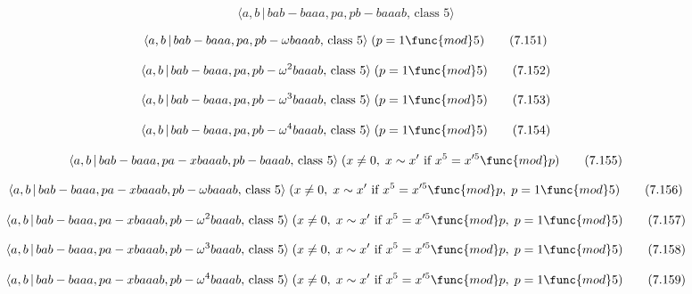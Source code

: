 \documentclass[10pt]{article}
\begin{document}
\begin{equation}
\langle a,b\,|\,bab-baaa,pa,pb-baaab,\,\text{class }5\rangle  \tag{7.150}
\end{equation}

\begin{equation}
\langle a,b\,|\,bab-baaa,pa,pb-\omega baaab,\,\text{class }5\rangle \;(p=1%
\func{mod}5)  \tag{7.151}
\end{equation}

\begin{equation}
\langle a,b\,|\,bab-baaa,pa,pb-\omega ^{2}baaab,\,\text{class }5\rangle
\;(p=1\func{mod}5)  \tag{7.152}
\end{equation}

\begin{equation}
\langle a,b\,|\,bab-baaa,pa,pb-\omega ^{3}baaab,\,\text{class }5\rangle
\;(p=1\func{mod}5)  \tag{7.153}
\end{equation}

\begin{equation}
\langle a,b\,|\,bab-baaa,pa,pb-\omega ^{4}baaab,\,\text{class }5\rangle
\;(p=1\func{mod}5)  \tag{7.154}
\end{equation}

\begin{equation}
\langle a,b\,|\,bab-baaa,pa-xbaaab,pb-baaab,\,\text{class }5\rangle \;(x\neq
0,\;x\sim x^{\prime }\text{ if }x^{5}=x^{\prime 5}\func{mod}p)  \tag{7.155}
\end{equation}

\begin{equation}
\langle a,b\,|\,bab-baaa,pa-xbaaab,pb-\omega baaab,\,\text{class }5\rangle
\;(x\neq 0,\;x\sim x^{\prime }\text{ if }x^{5}=x^{\prime 5}\func{mod}p,\;p=1%
\func{mod}5)  \tag{7.156}
\end{equation}

\begin{equation}
\langle a,b\,|\,bab-baaa,pa-xbaaab,pb-\omega ^{2}baaab,\,\text{class }%
5\rangle \;(x\neq 0,\;x\sim x^{\prime }\text{ if }x^{5}=x^{\prime 5}\func{mod%
}p,\;p=1\func{mod}5)  \tag{7.157}
\end{equation}

\begin{equation}
\langle a,b\,|\,bab-baaa,pa-xbaaab,pb-\omega ^{3}baaab,\,\text{class }%
5\rangle \;(x\neq 0,\;x\sim x^{\prime }\text{ if }x^{5}=x^{\prime 5}\func{mod%
}p,\;p=1\func{mod}5)  \tag{7.158}
\end{equation}

\begin{equation}
\langle a,b\,|\,bab-baaa,pa-xbaaab,pb-\omega ^{4}baaab,\,\text{class }%
5\rangle \;(x\neq 0,\;x\sim x^{\prime }\text{ if }x^{5}=x^{\prime 5}\func{mod%
}p,\;p=1\func{mod}5)  \tag{7.159}
\end{equation}
\end{document}
